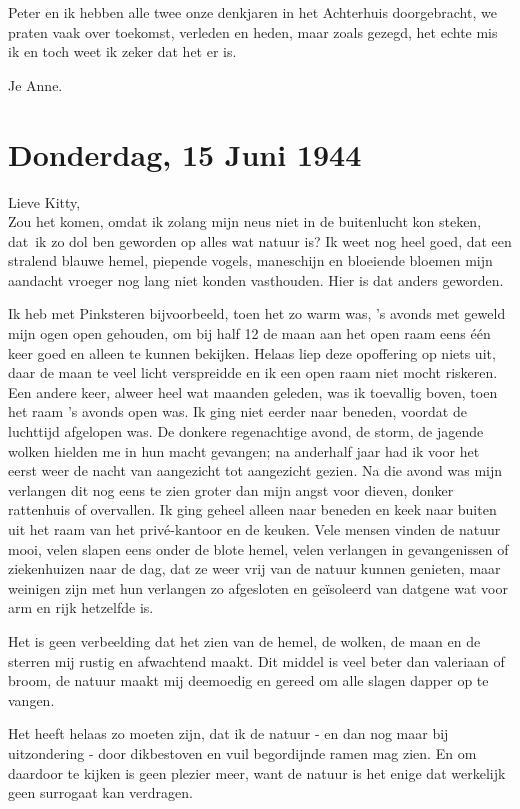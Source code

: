 \documentclass{book}
\begin{document}
Peter en ik hebben alle twee onze denkjaren in het Achterhuis
doorgebracht, we praten vaak over toekomst, verleden en heden, maar
zoals gezegd, het echte mis ik en toch weet ik zeker dat het er is.

Je Anne.

\chapter{Donderdag, 15 Juni 1944}

Lieve Kitty,\\Zou het komen, omdat ik zolang mijn neus niet in de
buitenlucht kon steken, dat~ik zo dol ben geworden op alles wat natuur
is? Ik weet nog heel goed, dat een stralend blauwe hemel, piepende
vogels, maneschijn en bloeiende bloemen mijn aandacht vroeger nog lang
niet konden vasthouden. Hier is dat anders geworden.

Ik heb met Pinksteren bijvoorbeeld, toen het zo warm was, 's avonds met
geweld mijn ogen open gehouden, om bij half 12 de maan aan het open raam
eens één keer goed en alleen te kunnen bekijken. Helaas liep deze
opoffering op niets uit, daar de maan te veel licht verspreidde en ik
een open raam niet mocht riskeren. Een andere keer, alweer heel wat
maanden geleden, was ik toevallig boven, toen het raam 's avonds open
was. Ik ging niet eerder naar beneden, voordat de luchttijd afgelopen
was. De donkere regenachtige avond, de storm, de jagende wolken hielden
me in hun macht gevangen; na anderhalf jaar had ik voor het eerst weer
de nacht van aangezicht tot aangezicht gezien. Na die avond was mijn
verlangen dit nog eens te zien groter dan mijn angst voor dieven, donker
rattenhuis of overvallen. Ik ging geheel alleen naar beneden en keek
naar buiten uit het raam van het privé-kantoor en de keuken. Vele mensen
vinden de natuur mooi, velen slapen eens onder de blote hemel, velen
verlangen in gevangenissen of ziekenhuizen naar de dag, dat ze weer vrij
van de natuur kunnen genieten, maar weinigen zijn met hun verlangen zo
afgesloten en geïsoleerd van datgene wat voor arm en rijk hetzelfde is.

Het is geen verbeelding dat het zien van de hemel, de wolken, de maan en
de sterren mij rustig en afwachtend maakt. Dit middel is veel beter dan
valeriaan of broom, de natuur maakt mij deemoedig en gereed om alle
slagen dapper op te vangen.

Het heeft helaas zo moeten zijn, dat ik de natuur - en dan nog maar bij
uitzondering - door dikbestoven en vuil begordijnde ramen mag zien. En
om daardoor te kijken is geen plezier meer, want de natuur is het enige
dat werkelijk geen surrogaat kan verdragen.
\end{document}
